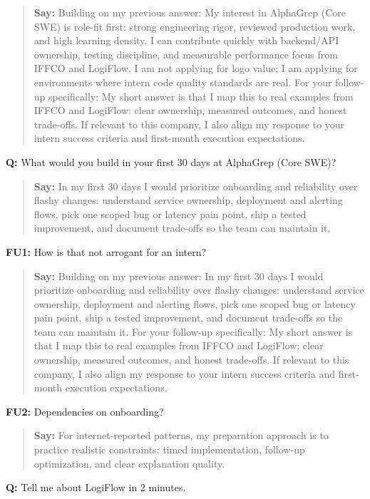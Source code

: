 \documentclass[9pt,a4paper]{article}
\begin{document}
\begin{quote}\small\textbf{Say:} Building on my previous answer: My interest in AlphaGrep (Core SWE) is role-fit first: strong engineering rigor, reviewed production work, and high learning density. I can contribute quickly with backend/API ownership, testing discipline, and measurable performance focus from IFFCO and LogiFlow. I am not applying for logo value; I am applying for environments where intern code quality standards are real. For your follow-up specifically: My short answer is that I map this to real examples from IFFCO and LogiFlow: clear ownership, measured outcomes, and honest trade-offs. If relevant to this company, I also align my response to your intern success criteria and first-month execution expectations.\end{quote}
\vspace{2mm}
\textbf{Q:} What would you build in your first 30 days at AlphaGrep (Core SWE)?

\begin{quote}\small\textbf{Say:} In my first 30 days I would prioritize onboarding and reliability over flashy changes: understand service ownership, deployment and alerting flows, pick one scoped bug or latency pain point, ship a tested improvement, and document trade-offs so the team can maintain it.\end{quote}
\vspace{2mm}
\textbf{FU1:} How is that not arrogant for an intern?

\begin{quote}\small\textbf{Say:} Building on my previous answer: In my first 30 days I would prioritize onboarding and reliability over flashy changes: understand service ownership, deployment and alerting flows, pick one scoped bug or latency pain point, ship a tested improvement, and document trade-offs so the team can maintain it. For your follow-up specifically: My short answer is that I map this to real examples from IFFCO and LogiFlow: clear ownership, measured outcomes, and honest trade-offs. If relevant to this company, I also align my response to your intern success criteria and first-month execution expectations.\end{quote}
\vspace{2mm}
\textbf{FU2:} Dependencies on onboarding?

\begin{quote}\small\textbf{Say:} For internet-reported patterns, my preparation approach is to practice realistic constraints: timed implementation, follow-up optimization, and clear explanation quality.\end{quote}
\vspace{2mm}
\textbf{Q:} Tell me about LogiFlow in 2 minutes.
\end{document}
